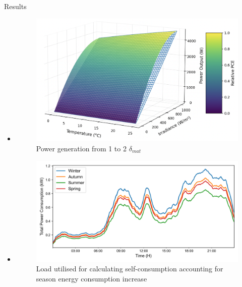\begin{frame}[c]{Results}

    \begin{itemize}
        \item<only@1>[]
            \begin{figure}
                \centering
                \includegraphics[width=\columnwidth]{Figures/3d_PV.png}
                \caption{Power generation from 1 to 2 \(\delta_{mat}\)}
            \end{figure}

        \item<only@2>[]
            \begin{figure}
                \centering
                \includegraphics[width=\columnwidth]{Figures/load_season.png}
                \caption{Load utilised for calculating self-consumption accounting for season energy consumption increase}
            \end{figure}
            

\end{itemize}
\end{frame}
